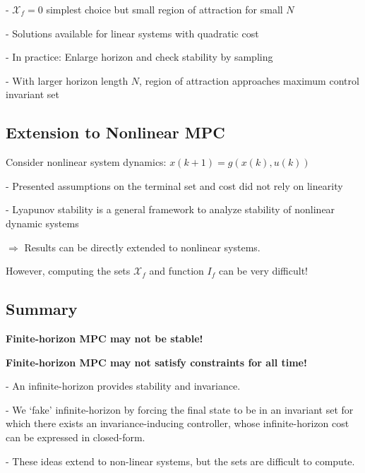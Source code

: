 - $\mathcal{X}_f = 0$ simplest choice
but small region of attraction for small $N$

- Solutions available for linear systems with quadratic cost

- In practice: Enlarge horizon and check stability by sampling

- With larger horizon length $N$,
region of attraction approaches maximum control invariant set

\subsection{Extension to Nonlinear MPC}

Consider nonlinear system dynamics: $x(k+1) = g(x(k), u(k))$


- Presented assumptions on the terminal set and cost
did not rely on linearity

- Lyapunov stability is a general framework to analyze
stability of nonlinear dynamic systems

$\Rightarrow$ Results can be directly extended to nonlinear systems.

However, computing the sets $\mathcal{X}_f$
and function $I_f$ can be very difficult!

\subsection{Summary}

\textbf{Finite-horizon MPC may not be stable!}

\textbf{Finite-horizon MPC may not satisfy constraints for all time!}

- An infinite-horizon provides stability and invariance.

- We ‘fake’ infinite-horizon by forcing the final state to be in an invariant
set for which there exists an invariance-inducing controller, whose
infinite-horizon cost can be expressed in closed-form.

- These ideas extend to non-linear systems,
but the sets are difficult to compute.
